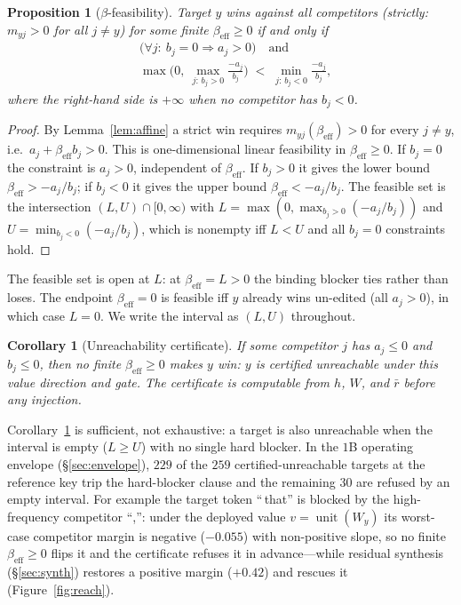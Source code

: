 \documentclass[11pt]{article}
\newtheorem{proposition}{Proposition}
\newtheorem{corollary}{Corollary}
\theoremstyle{remark}
\DeclareMathOperator{\unit}{unit}
\begin{document}
\begin{proposition}[$\beta$-feasibility]
\label{prop:reach}
Target $y$ wins against all competitors (strictly: $m_{yj}>0$ for all $j\ne y$)
for some finite
$\beta_{\mathrm{eff}}\ge 0$ if and only if
\[
\begin{aligned}
&\big(\forall j:\ b_j=0 \Rightarrow a_j>0\big)\quad\text{and}\\
&\max\!\Big(0,\ \max_{j:\,b_j>0}\tfrac{-a_j}{b_j}\Big)
\;<\;
\min_{j:\,b_j<0}\tfrac{-a_j}{b_j},
\end{aligned}
\]
where the right-hand side is $+\infty$ when no competitor has $b_j<0$.
\end{proposition}
\begin{proof}
By Lemma~\ref{lem:affine} a strict win requires $m_{yj}(\beta_{\mathrm{eff}})>0$
for every $j\ne y$, i.e.\ $a_j+\beta_{\mathrm{eff}}b_j>0$. This is one-dimensional
linear feasibility in $\beta_{\mathrm{eff}}\ge 0$. If $b_j=0$ the constraint is
$a_j>0$, independent of $\beta_{\mathrm{eff}}$. If $b_j>0$ it gives the lower bound
$\beta_{\mathrm{eff}}>-a_j/b_j$; if $b_j<0$ it gives the upper bound
$\beta_{\mathrm{eff}}<-a_j/b_j$. The feasible set is the intersection
$(L,U)\cap[0,\infty)$ with $L=\max(0,\max_{b_j>0}(-a_j/b_j))$ and
$U=\min_{b_j<0}(-a_j/b_j)$, which is nonempty iff $L<U$ and all $b_j=0$
constraints hold.
\end{proof}
\noindent The feasible set is open at $L$: at $\beta_{\mathrm{eff}}=L>0$ the
binding blocker ties rather than loses. The endpoint $\beta_{\mathrm{eff}}=0$ is
feasible iff $y$ already wins un-edited (all $a_j>0$), in which case $L=0$. We
write the interval as $(L,U)$ throughout.

\begin{corollary}[Unreachability certificate]
\label{cor:unflip}
If some competitor $j$ has $a_j\le 0$ and $b_j\le 0$, then no finite
$\beta_{\mathrm{eff}}\ge 0$ makes $y$ win: $y$ is certified unreachable under this
value direction and gate. The certificate is computable from $h$, $W$, and
$\bar r$ before any injection.
\end{corollary}
\noindent Corollary~\ref{cor:unflip} is sufficient, not exhaustive: a target is
also unreachable when the interval is empty ($L\ge U$) with no single hard
blocker. In the $1$B operating envelope (\S\ref{sec:envelope}), $229$ of the
$259$ certified-unreachable targets at the reference key trip the hard-blocker
clause and the remaining $30$ are refused by an empty interval. For example the target
token ``\,that'' is blocked by the high-frequency competitor ``,'': under the deployed
value $v=\unit(W_y)$ its worst-case competitor margin is negative ($-0.055$) with
non-positive slope, so no finite $\beta_{\mathrm{eff}}\ge0$ flips it and the certificate
refuses it in advance---while residual synthesis (\S\ref{sec:synth}) restores a positive
margin ($+0.42$) and rescues it (Figure~\ref{fig:reach}).
\end{document}
